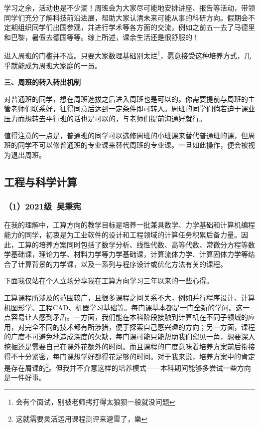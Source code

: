 \documentclass[11pt,oneside]{book}
\begin{document}
\vspace{10pt}

学习之余，活动也是不少滴！周班会为大家尽可能地安排讲座、报告等活动，带领同学们充分了解科技前沿进展，帮助大家认清未来可能从事的科研方向。假期会不定期组织同学们出国参观，并进行学术等各方面的交流，例如之前五一去了马德里和巴黎，暑假去德国等等。综上所述，课余生活还是很舒服的！

\vspace{10pt}

进入周班的门槛并不高。只要大家数理基础别太烂\footnote{会有个面试，别被老师拷打得太狼狈一般就没问题}，愿意接受这种培养方式，几乎就能成为周班大家庭的一员。

\vspace{10pt}

\textbf{\textbf{三、周班的转入转出机制}}

对普通班的同学，想在周班选拔之后进入周班也是可以的。你需要提前与周班的主管老师们联系好，征得同意后达到一定条件即可转入。周班的同学们倘若迫于课业压力而想转去平行班的话也是可以的，与老师们提前沟通好就行。

\vspace{10pt}

值得注意的一点是，普通班的同学可以选修周班的小班课来替代普通班的课，但周班的同学不可以修普通班的专业课来替代周班的专业课。一旦如此操作，便会被视为退出周班。

\subsection{工程与科学计算}
\subsubsection{（1）2021级\ 吴秉宪}

在我的理解中，工算方向的教学目标是培养一批兼具数学、力学基础和计算机编程能力的同学，初衷是为工业软件的设计和工程领域的计算任务积累后备力量。因此，工算的培养方案同时包括了数学分析、线性代数、高等代数、常微分方程等数学基础课，理论力学、材料力学等力学基础课，计算流体力学、计算固体力学等结合了计算背景的力学课，以及一系列与程序设计或优化方法有关的课程。

\vspace{10pt}

下面我仅站在个人立场分享我在工算方向学习三年以来的一些心得。

\vspace{10pt}

工算课程所涉及的范围较广，且很多课程之间关系不大，例如并行程序设计、计算机图形学、工程CAD、机器学习基础等。每门课基本都是一门全新的学问。这一点容易让人感到矛盾。一方面，我们能在本科阶段接触到计算机在不同子领域的应用，对完全不同的技术都有所涉猎，便于探索自己感兴趣的方向；另一方面，课程的广度不可避免地造成深度的欠缺，每门课可能只能帮助我们窥见一角，想要深入挖掘还是需要自己在课外花额外的时间。而且课程的广度意味着培养方案前后衔接得不十分紧密，每门课想学好都得花足够的时间。对于我来说，培养方案中的肯定是存在屑课的\footnote{这就需要灵活运用课程测评来避雷了，樂}。但我并不介意这样的培养模式——本科期间能够多尝试一些方向是一件好事。
\end{document}
